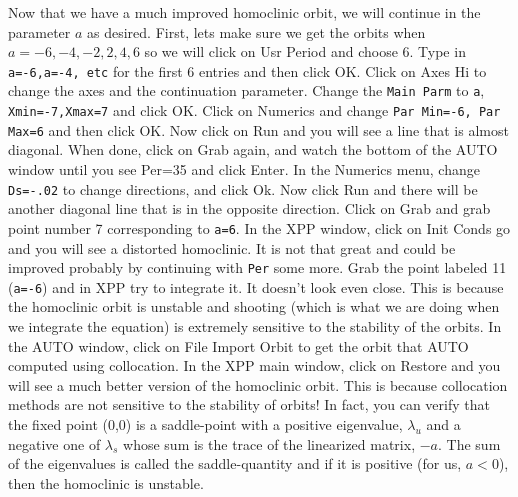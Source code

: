 \documentclass{article}
\begin{document}
Now that we have a much improved homoclinic orbit, we will continue in
the parameter $a$ as desired.  First, lets make sure we get the orbits
when $a=-6,-4,-2,2,4,6$ so we will click on Usr Period and choose
6. Type in {\tt a=-6,a=-4, etc} for the first 6 entries and then click OK.
Click on Axes Hi to change the axes and the continuation
parameter. Change the {\tt Main Parm} to {\tt a}, {\tt Xmin=-7,Xmax=7}
and click OK. Click on Numerics and change {\tt Par Min=-6, Par Max=6}
and then click OK. Now click on Run and you will see a line that is
almost diagonal.  When done, click on Grab again, and watch the bottom
of the AUTO window until you see Per=35 and click Enter. In the
Numerics menu, change {\tt Ds=-.02} to change directions, and click
Ok. Now click Run and there will be another diagonal line that is in
the opposite direction.  Click on Grab and grab point number 7
corresponding to {\tt a=6}. In the XPP window, click on Init Conds go
and you will see a distorted homoclinic. It is not that great and
could be improved probably by continuing with {\tt Per} some
more. Grab the point labeled  11 ({\tt a=-6}) and in XPP try to
integrate it. It doesn't look even close. This is because the
homoclinic orbit is unstable and shooting (which is what we are doing
when we integrate the equation) is extremely sensitive to the
stability of the orbits. In the AUTO window, click on File Import
Orbit to get the orbit that AUTO computed using collocation. In the
XPP main window, click on Restore and you will see a much better
version of the homoclinic orbit. This is because collocation methods
are not sensitive to the stability of orbits! In fact, you can verify
that the fixed point (0,0) is a saddle-point with a positive
eigenvalue, $\lambda_u$ and a negative one of $\lambda_s$ whose sum is
the trace of the linearized matrix, $-a$. The sum of the eigenvalues
is called the saddle-quantity and if it is positive (for us, $a<0$),
then the homoclinic is unstable.
\end{document}
